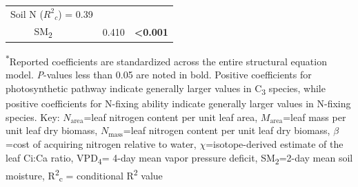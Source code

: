 \begin{table}
\begin{tabular}{p{0.5cm}p{3cm}p{1.5cm}p{1.5cm}}
            \multicolumn{2}{l}{Soil N ($R^2{}_c$) = 0.39} && \\
            & \multicolumn{1}{l}{SM\textsubscript{2}} & \multicolumn{1}{r}{0.410} & \multicolumn{1}{r}{\textbf{<0.001}} \\
            \hline

        \end{tabular}%
    \end{table}
    \noindent \textsuperscript{$*$}Reported coefficients are standardized across the entire structural equation model. \textit{P}-values less than 0.05 are noted in bold. Positive coefficients for photosynthetic pathway indicate generally larger values in C\textsubscript{3} species, while positive coefficients for N-fixing ability indicate generally larger values in N-fixing species. Key: $N_\mathrm{area}$=leaf nitrogen content per unit leaf area, $M_\mathrm{area}$=leaf mass per unit leaf dry biomass, $N_\mathrm{mass}$=leaf nitrogen content per unit leaf dry biomass, $\beta$=cost of acquiring nitrogen relative to water, $\chi$=isotope-derived estimate of the leaf Ci:Ca ratio, VPD\textsubscript{4}= 4-day mean vapor pressure deficit, SM\textsubscript{2}=2-day mean soil moisture, R\textsuperscript{2}\textsubscript{c} = conditional R\textsuperscript{2} value
\clearpage



